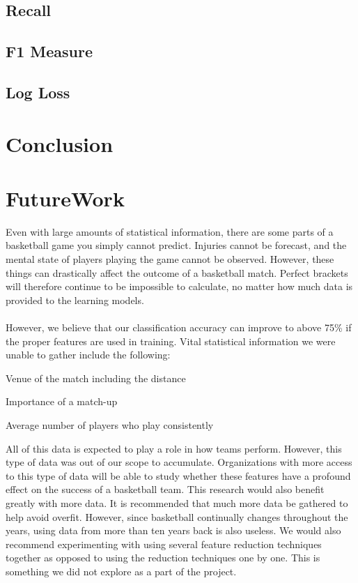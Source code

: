 \documentclass{article}
\begin{document}
\begin{multicols}{2}
	\subsection{Recall}
	\subsection{F1 Measure}
	\subsection{Log Loss}
	
	\section{Conclusion}
	\section{FutureWork}	 
Even with large amounts of statistical information, there are some parts of a basketball game you simply cannot predict. Injuries cannot be forecast, and the mental state of players playing the game cannot be observed. However, these things can drastically affect the outcome of a basketball match. Perfect brackets will therefore continue to be impossible to calculate, no matter how much data is provided to the learning models.

\paragraph{}However, we believe that our classification accuracy can improve to above 75\% if the proper features are used in training. Vital statistical information we were unable to gather include the following:
\begin{list}{•}
\item
Venue of the match including the distance
\item
Importance of a match-up
\item
Average number of players who play consistently
\end{list}

All of this data is expected to play a role in how teams perform. However, this type of data was out of our scope to accumulate. Organizations with more access to this type of data will be able to study whether these features have a profound effect on the success of a basketball team. This research would also benefit greatly with more data. It is recommended that much more data be gathered to help avoid overfit. However, since basketball continually changes throughout the years, using data from more than ten years back is also useless. We would also recommend experimenting with using several feature reduction techniques together as opposed to using the reduction techniques one by one. This is something we did not explore as a part of the project.
	
	\end{multicols} 
\end{document}
